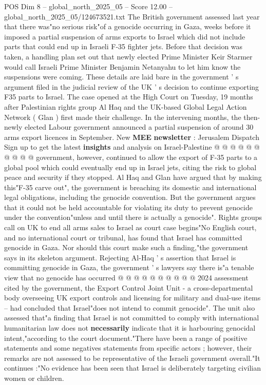 \begin{textsample}{POS Dim 8 – global\_north\_2025\_05 – Score 12.00 – global\_north\_2025\_05/124673521.txt}  \label{ex:f8_pos_040}
The British government assessed last year that there was"no serious risk"of a genocide occurring in Gaza, weeks before it imposed a partial suspension of arms exports to Israel which did not include parts that could end up in Israeli F-35 fighter jets.
Before that decision was taken, a handling plan set out that newly elected Prime Minister Keir Starmer would call Israeli Prime Minister Benjamin Netanyahu to let him know the suspensions were coming.
These details are laid bare in the government ' s argument filed in the judicial review of the UK ' s decision to continue exporting F35 parts to Israel.
The case opened at the High Court on Tuesday, 19 months after Palestinian rights group Al Haq and the UK-based Global Legal Action Network ( Glan ) first made their challenge.
In the intervening months, the then-newly elected Labour government announced a partial suspension of around 30 arms export licences in September.
New \textbf{MEE} \textbf{newsletter} : Jerusalem Dispatch Sign up to get the latest \textbf{insights} and analysis on Israel-Palestine @ @ @ @ @ @ @ @ @ @ government, however, continued to allow the export of F-35 parts to a global pool which could eventually end up in Israel jets, citing the risk to global peace and security if they stopped.
Al Haq and Glan have argued that by making this"F-35 carve out", the government is breaching its domestic and international legal obligations, including the genocide convention.
But the government argues that it could not be held accountable for violating its duty to prevent genocide under the convention"unless and until there is actually a genocide".
Rights groups call on UK to end all arms sales to Israel as court case begins"No English court, and no international court or tribunal, has found that Israel has committed genocide in Gaza.
Nor should this court make such a finding,"the government says in its skeleton argument.
Rejecting Al-Haq ' s assertion that Israel is committing genocide in Gaza, the government ' s lawyers say there is"a tenable view that no genocide has occurred @ @ @ @ @ @ @ @ @ @ 2024 assessment cited by the government, the Export Control Joint Unit - a cross-departmental body overseeing UK export controls and licensing for military and dual-use items -- had concluded that Israel"does not intend to commit genocide".
The unit also assessed that"a finding that Israel is not committed to comply with international humanitarian law does not \textbf{necessarily} indicate that it is harbouring genocidal intent,"according to the court document."There have been a range of positive statements and some negatives statements from specific actors ; however, their remarks are not assessed to be representative of the Israeli government overall."It continues :"No evidence has been seen that Israel is deliberately targeting civilian women or children.

\end{textsample}
